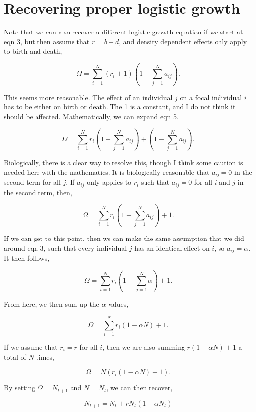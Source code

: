 \documentclass[
]{article}
\begin{document}
\hypertarget{recovering-proper-logistic-growth}{%
\section{Recovering proper logistic
growth}\label{recovering-proper-logistic-growth}}

Note that we can also recover a different logistic growth equation if we
start at eqn 3, but then assume that \(r = b - d\), and density
dependent effects only apply to birth and death,

\[\Omega = \sum_{i=1}^{N} \left(r_{i} + 1 \right)\left(1 - \sum_{j = 1}^{N}a_{ij} \right).
\tag{5}
\]

This seems more reasonable. The effect of an individual \(j\) on a focal
individual \(i\) has to be either on birth or death. The 1 is a
constant, and I do not think it should be affected. Mathematically, we
can expand eqn 5.

\[\Omega = \sum_{i=1}^{N} r_{i}\left(1 - \sum_{j = 1}^{N}a_{ij} \right) + \left(1 - \sum_{j = 1}^{N}a_{ij} \right).\]

Biologically, there is a clear way to resolve this, though I think some
caution is needed here with the mathematics. It is biologically
reasonable that \(a_{ij} = 0\) in the second term for all \(j\). If
\(a_{ij}\) only applies to \(r_{i}\) such that \(a_{ij} = 0\) for all
\(i\) and \(j\) in the second term, then,

\[\Omega = \sum_{i=1}^{N} r_{i}\left(1 - \sum_{j = 1}^{N}a_{ij} \right) + 1.\]

If we can get to this point, then we can make the same assumption that
we did around eqn 3, such that every individual \(j\) has an identical
effect on \(i\), so \(a_{ij} = \alpha\). It then follows,

\[\Omega = \sum_{i=1}^{N} r_{i}\left(1 - \sum_{j = 1}^{N}\alpha \right) + 1.\]

From here, we then sum up the \(\alpha\) values,

\[\Omega = \sum_{i=1}^{N} r_{i}\left(1 - \alpha N \right) + 1.\]

If we assume that \(r_{i} = r\) for all \(i\), then we are also summing
\(r(1 - \alpha N) + 1\) a total of \(N\) times,

\[\Omega = N \left( r_{i}\left(1 - \alpha N \right) + 1\right).\]

By setting \(\Omega = N_{t+1}\) and \(N = N_{t}\), we can then recover,

\[N_{t+1} = N_{t} + rN_{t}\left(1 - \alpha N_{t}\right)\]
\end{document}
